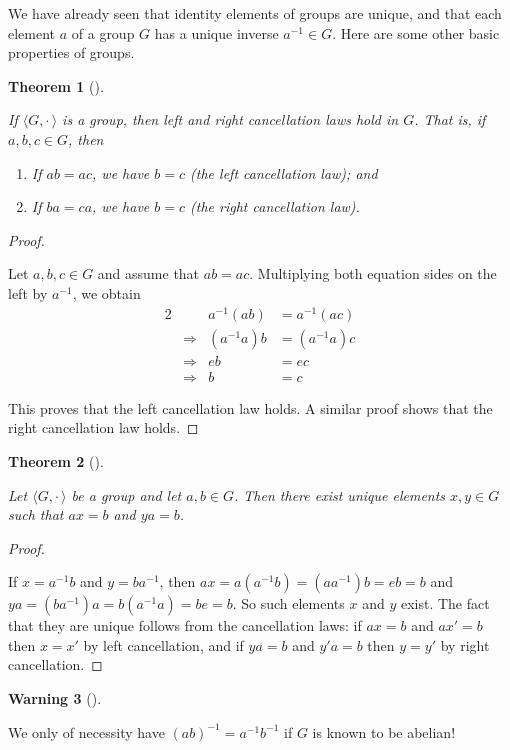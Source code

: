 \documentclass[10pt,]{book}
\theoremstyle{plain}
\newtheorem{theorem}{Theorem}[section]
\theoremstyle{definition}
\theoremstyle{definition}
\newtheorem{warning}[theorem]{Warning}
\theoremstyle{definition}
\theoremstyle{definition}
\numberwithin{equation}{section}
\def\Gdot{\langle G, \cdot\,\rangle}
\newcommand{\amp}{ & }
\begin{document}
      We have already seen that identity elements of groups are unique,
      and that each element \(a\) of a group \(G\) has a unique inverse
      \(a^{-1}\in G\). Here are some other basic properties of groups.
\begin{theorem}[{}]\label{cancel}

          If \(\Gdot\) is a group, then \emph{\emph{left and right cancellation laws}} hold in \(G\). That is, if \(a,b,c\in G\), then
          \leavevmode%
\begin{enumerate}
\item\hypertarget{li-93}{}
                If \(ab=ac\), we have \(b=c\) (the left cancellation law); and
\item\hypertarget{li-94}{}
                If \(ba=ca\), we have \(b=c\) (the right cancellation law).
\end{enumerate}

\end{theorem}
\begin{proof}\hypertarget{proof-10}{}

        Let \(a,b,c\in G\) and assume that \(ab=ac\). Multiplying
        both equation sides on the left by \(a^{-1}\), we obtain
\begin{align*}
{2}
          \amp \amp  a^{-1}(ab)\amp =a^{-1}(ac)\\
\amp \Rightarrow
          \amp (a^{-1}a)b\amp =(a^{-1}a)c\\
\amp \Rightarrow
          \amp eb\amp =ec\\
\amp \Rightarrow
          \amp b\amp =c
\end{align*}

\par

        This proves that the left cancellation law holds. A similar proof shows that the right cancellation law holds.
\end{proof}
\begin{theorem}[{}]\label{uniquesols}

          Let \(\Gdot\) be a group and let \(a,b\in G\). Then there exist \emph{\emph{unique}} elements \(x,y\in G\) such that \(ax=b\) and \(ya=b\).
\end{theorem}
\begin{proof}\hypertarget{proof-11}{}

        If \(x=a^{-1}b\) and \(y=ba^{-1}\), then
        \(ax=a(a^{-1}b)=(aa^{-1})b=eb=b\) and
        \(ya=(ba^{-1})a=b(a^{-1}a)=be=b\). So such elements \(x\) and \(y\)
        exist. The fact that they are unique follows from the cancellation
        laws: if \(ax=b\) and \(ax'=b\) then \(x=x'\) by left cancellation, and
        if \(ya=b\) and \(y'a=b\) then \(y=y'\) by right cancellation.
\end{proof}
\begin{warning}[]\label{warning-9}

        We only of necessity have \((ab)^{-1}=a^{-1}b^{-1}\) if \(G\) is known to be abelian!
\end{warning}
\par
\end{document}
